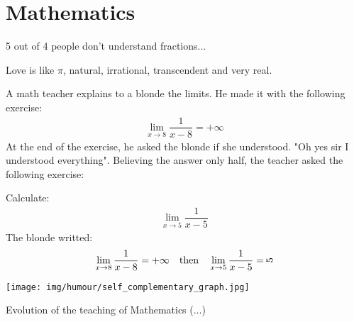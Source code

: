 	\pagebreak
	\section{Mathematics}

5 out of 4 people don't understand fractions...
	\begin{center}\underline{\hspace{5 cm}}\end{center}

Love is like $\pi$, natural, irrational, transcendent and very real.
	\begin{center}\underline{\hspace{5 cm}}\end{center}

A math teacher explains to a blonde the limits. He made it with the following exercise:
	\begin{gather*}
	\lim_{x \rightarrow 8} \dfrac{1}{x-8}=+\infty
	\end{gather*}
At the end of the exercise, he asked the blonde if she understood. "Oh yes sir I understood everything". Believing the answer only half, the teacher asked the following exercise:

Calculate:
	\begin{gather*}
	\lim_{x \rightarrow 5} \dfrac{1}{x-5}
	\end{gather*}
The blonde writted: 
	\begin{gather*}
	\lim_{x \rightarrow 8} \dfrac{1}{x-8}=+\infty \quad  \text{then} \quad \lim_{x \rightarrow 5} \dfrac{1}{x-5}= \rotatebox[origin=c]{90}{5}  
	\end{gather*}
	\begin{center}\underline{\hspace{5 cm}}\end{center}
	
	\begin{center}
		\texttt{[image: img/humour/self\_complementary\_graph.jpg]}	
	\end{center}
	
	\pagebreak
Evolution of the teaching of Mathematics (...)

